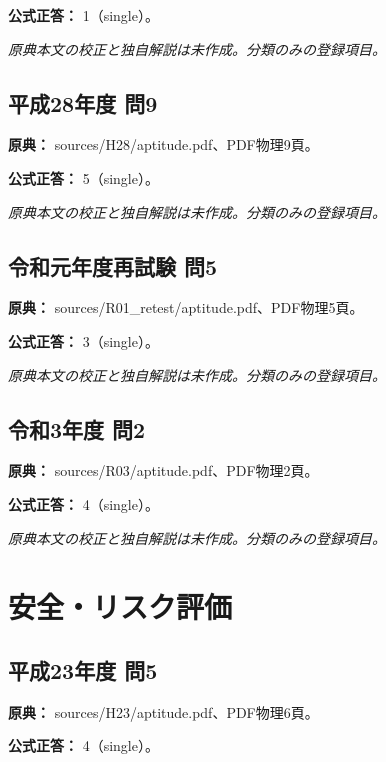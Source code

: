 \textbf{公式正答：} 1（single）。

\par\textit{原典本文の校正と独自解説は未作成。分類のみの登録項目。}

\subsection{平成28年度 問9}
\label{q:h28-reg-apt-09}

\noindent\textbf{原典：} sources/H28/aptitude.pdf、PDF物理9頁。

\textbf{公式正答：} 5（single）。

\par\textit{原典本文の校正と独自解説は未作成。分類のみの登録項目。}

\subsection{令和元年度再試験 問5}
\label{q:r01-ret-apt-05}

\noindent\textbf{原典：} sources/R01\_retest/aptitude.pdf、PDF物理5頁。

\textbf{公式正答：} 3（single）。

\par\textit{原典本文の校正と独自解説は未作成。分類のみの登録項目。}

\subsection{令和3年度 問2}
\label{q:r03-reg-apt-02}

\noindent\textbf{原典：} sources/R03/aptitude.pdf、PDF物理2頁。

\textbf{公式正答：} 4（single）。

\par\textit{原典本文の校正と独自解説は未作成。分類のみの登録項目。}

\section{安全・リスク評価}

\subsection{平成23年度 問5}
\label{q:h23-reg-apt-05}

\noindent\textbf{原典：} sources/H23/aptitude.pdf、PDF物理6頁。

\textbf{公式正答：} 4（single）。

